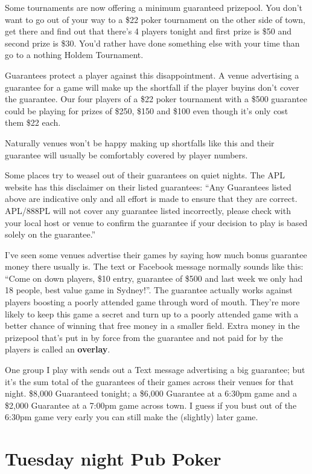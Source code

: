 Some tournaments are now offering a minimum guaranteed prizepool. You
don't want to go out of your way to a \$22 poker tournament on the
other side of town, get there and find out that there's 4 players tonight
and first prize is \$50 and second prize is \$30. You'd rather have
done something else with your time than go to a nothing Holdem Tournament.

Guarantees protect a player against this disappointment. A venue
advertising a guarantee for a game will make up the shortfall if the
player buyins don't cover the guarantee. Our four players of a \$22
poker tournament with a \$500 guarantee could be playing for prizes
of \$250, \$150 and \$100 even though it's only cost them \$22 each.

Naturally venues won't be happy making up shortfalls like this and
their guarantee will usually be comfortably covered by player numbers.

Some places try to weasel out of their guarantees on quiet nights.
The APL website has this disclaimer on their listed guarantees:
``Any Guarantees listed above are indicative only and all effort
is made to ensure that they are correct. APL/888PL will not cover
any guarantee listed incorrectly, please check with your local
host or venue to confirm the guarantee if your decision to
play is based solely on the guarantee.''

I've seen some venues advertise their games by saying how much bonus
guarantee money there usually is. The text or Facebook message
normally sounds like this: ``Come on down players, \$10 entry,
guarantee of \$500 and last week we only had 18 people, best value
game in Sydney!''. The guarantee actually works against players
boosting a poorly attended game through word of
mouth. They're more likely to keep this game a secret and turn up to a
poorly attended game with a better chance of winning that free money
in a smaller field. Extra money in the prizepool that's put in by force
from the guarantee and not paid for by the players is called an
\textbf{overlay}.

One group I play with sends out a Text message advertising a big
guarantee; but it's the sum total of the guarantees of their games
across their venues for that night. \$8,000 Guaranteed tonight; a
\$6,000 Guarantee at a 6:30pm game and a \$2,000 Guarantee at
a 7:00pm game across town. I guess if you bust out of the 6:30pm game
very early you can still make the (slightly) later game.

\section{Tuesday night Pub Poker}

